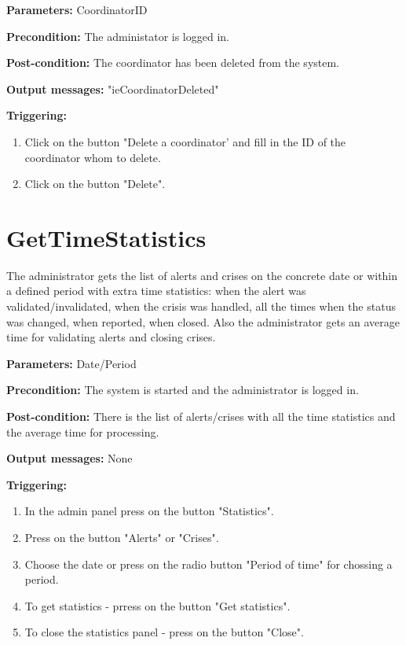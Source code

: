 \begin{description}
	\item \textbf{Parameters:} CoordinatorID
	\item \textbf{Precondition:} The administator is logged in.
	\item \textbf{Post-condition:} The coordinator has been deleted from the
	system.
	\item \textbf{Output messages:} "ieCoordinatorDeleted"
	
	\item \textbf{Triggering:}
	
	\begin{enumerate}
		\item Click on the button "Delete a coordinator' and fill in the ID of the
		coordinator whom to delete.
		\item Click on the button "Delete".
	\end{enumerate}
\end{description}


\section{GetTimeStatistics}
\label{operation:GetTimeStatistics}

The administrator gets the list of alerts and crises on the concrete date or
within a defined period with extra time statistics: when the alert was
validated/invalidated, when the crisis was handled, all the times when the status was changed, when reported, when closed.
Also the administrator gets an average time for validating alerts and closing crises.


\begin{description}
	\item \textbf{Parameters:} Date/Period
	\item \textbf{Precondition:} The system is started and the administrator is
	logged in.
	\item \textbf{Post-condition:} There is the list of alerts/crises with all the
	time statistics and the average time for processing.
	\item \textbf{Output messages:} None
	
	\item \textbf{Triggering:}
	
	\begin{enumerate}
		\item In the admin panel press on the button "Statistics".
		\item Press on the button "Alerts" or "Crises".
		\item Choose the date or press on the radio button "Period of time" for
		chossing a period.
		\item To get statistics - prress on the button "Get statistics".
		\item To close the statistics panel - press on the button "Close".
	\end{enumerate}
\end{description}

